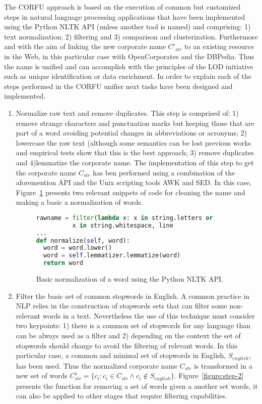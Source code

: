 \documentclass{llncs}
\begin{document}
The CORFU approach is based on the execution of common but customized steps in natural language processing applications that 
have been implemented using the Python NLTK API (unless another tool is named) and comprising: 1) text normalization; 2) filtering and 
3) comparison and clusterization. Furthermore and with the aim of linking the new corporate name $C'_{str}$ to an existing resource in the Web, in this particular case with OpenCorporates and the DBPedia. 
Thus the name is unified and can accomplish with the principles of the LOD initiative such as unique identification or data enrichment. 
In order to explain each of the steps performed in the CORFU unifier next tasks have been designed and implemented.

\begin{enumerate}
 \item Normalize raw text and remove duplicates. This step is comprised of: 1) remove strange characters and punctuation marks but keeping 
 those that are part of a word avoiding potential changes in  abbreviations or acronyms; 2) lowercase the raw text (although some semantics can 
 be lost previous works and empirical tests show that this is the best approach; 3) remove duplicates and 4)lemmatize the corporate name. 
 The implementation of this step to get the corporate name $C_{str}$ has ben performed using a combination of the aforemention API and 
 the Unix scripting tools AWK and SED. In this case, Figure~\ref{figure:step-1} presents 
 two relevant snippets of code for cleaning the name and making a basic a normalization of words. 
 
\begin{figure}[!h]
\begin{center}
\begin{lstlisting}[language=Python]        
rawname = filter(lambda x: x in string.letters or 
	      x in string.whitespace, line
...
def normalize(self, word):
  word = word.lower()
  word = self.lemmatizer.lemmatize(word)
  return word
\end{lstlisting}
\caption{Basic normalization of a word using the Python NLTK API.}
\label{figure:step-1}
\end{center}
\end{figure}
   
\item Filter the basic set of common stopwords in English. A common practice in NLP relies in the construction 
of stopwords sets that can filter some non-relevant words in a text. Nevertheless the use of this technique must 
consider two keypoints: 1) there is a common set of stopwords for any language than can be always used as a filter and 
2) depending on the context the set of stopwords should change to avoid the filtering of relevant words. In this particular 
case, a common and minimal set of stopwords in English,  $S_{english}$,  has been used. Thus the normalized corporate name $C_{str}$ is 
transformed in a new set of words $C^{1}_{str} = \{ c_i : c_i \in C_{str} \wedge c_i \notin S_{english}\}$. Figure~\ref{figure:step-2} presents 
the function for removing a set of words given a another set words, it can also be applied to other stages that require 
filtering capabilities.


\end{enumerate}
\end{document}

